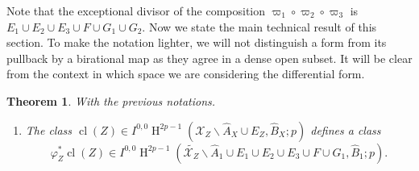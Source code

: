 \documentclass[11pt,a4paper]{amsart}
\newcommand{\caX}{\mathcal{X}}
\DeclareMathOperator {\cl}{cl}
\DeclareMathOperator{\rH}{H}
\numberwithin{equation}{section}
\theoremstyle{plain}
\newtheorem{thm}[prop]{Theorem}
\theoremstyle{definition}
\begin{document}
Note that the
exceptional divisor of the composition $\varpi_{1}\circ \varpi_2\circ \varpi_3$ is $E_{1}\cup E_{2} \cup E_{3}\cup
F\cup G_{1}\cup G_{2}$.
Now we state the main technical result of this section. To make the
notation lighter, we will not distinguish a form from its pullback by
a birational map as they agree in a dense open subset. It will be
clear from the context in which space we are considering the
differential form. 
\begin{thm}\label{thm:5} With the previous notations.
  \begin{enumerate}
  \item \label{item:5} The class $\cl(Z)\in I^{0,0}\rH^{2p-1}(\caX_{Z}\smallsetminus
    \widehat A_X\cup E_Z,\widehat B_X;p) $ defines a
    class
    \begin{displaymath}
      \varphi_{Z}^{\ast}\cl(Z)\in I^{0,0}\rH^{2p-1}(\widetilde {\caX_{Z}}\smallsetminus
    \widehat A_1\cup E_1\cup E_2\cup E_3\cup F\cup G_1, \widehat B_1;p). 
  \end{displaymath}
  

\end{enumerate}
\end{thm}
\end{document}
